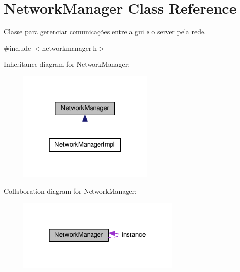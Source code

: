 \hypertarget{classNetworkManager}{}\section{Network\+Manager Class Reference}
\label{classNetworkManager}


Classe para gerenciar comunicações entre a gui e o server pela rede.  




{\ttfamily \#include $<$networkmanager.\+h$>$}



Inheritance diagram for Network\+Manager\+:
\nopagebreak
\begin{figure}[H]
\begin{center}
\leavevmode
\includegraphics[width=190pt]{d5/da1/classNetworkManager__inherit__graph}
\end{center}
\end{figure}


Collaboration diagram for Network\+Manager\+:
\nopagebreak
\begin{figure}[H]
\begin{center}
\leavevmode
\includegraphics[width=229pt]{d5/d38/classNetworkManager__coll__graph}
\end{center}
\end{figure}
